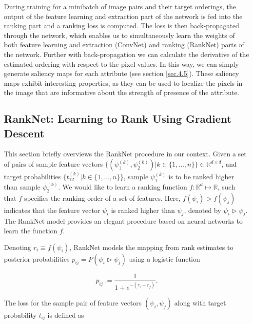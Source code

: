 During training for a minibatch of image pairs and their target orderings, the output of the feature learning and extraction part of the network is fed into the ranking part and a ranking loss is computed. The loss is then back-propagated through the network, which enables us to simultaneously learn the weights of both feature learning and extraction (ConvNet) and ranking (RankNet) parts of the network. %
Further with back-propagation we can calculate the derivative of the estimated ordering with respect to the pixel values.
In this way, we can simply generate saliency maps for each attribute (see section \ref{sec.4.5}). These saliency maps exhibit interesting properties, as they can be used to localize the pixels in the image that are informative about the strength of presence of the attribute.

\subsection{RankNet: Learning to Rank Using Gradient Descent}\label{sec3.1}

This section briefly overviews the RankNet \cite{Burges2005} procedure in our context.
Given a set of pairs of sample feature vectors $\big\{( \psi_{1}^{(k)}, \psi_{2}^{(k)} ) | k \in \{1, \dots, n\} \big\} \in \mathbb{R}^{d \times d}$, and target probabilities $\big\{ t_{12}^{(k)} | k \in \{1, \dots, n\} \big\}$, %
sample $\psi_{1}^{(k)}$ is to be ranked higher than sample $\psi_{2}^{(k)}$. %
We would like to learn a ranking function $f : \mathbb{R}^d \mapsto \mathbb{R}$, such that $f$ specifies the ranking order of a set of features. Here, $f(\psi_i) > f(\psi_j)$ indicates that the %
feature vector $\psi_i$ is ranked higher than $\psi_j$, denoted by $\psi_i \triangleright \psi_j$. The RankNet model \cite{Burges2005} provides an elegant procedure based on neural networks %
to learn the function $f$.

Denoting $r_i \equiv f(\psi_i)$, RankNet models the mapping from rank estimates to posterior probabilities $p_{ij} = P(\psi_i \triangleright \psi_j)$ using a logistic function 

\begin{equation}
p_{ij} := \frac{1}{1 + e^{-(r_i - r_j)}}.
\end{equation}

The loss for the sample pair of feature vectors $(\psi_i, \psi_j)$ along with target probability $t_{ij}$ is defined as

